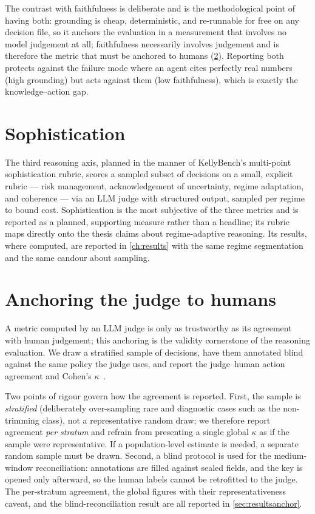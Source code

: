 The contrast with faithfulness is deliberate and is the methodological point of having both:
grounding is cheap, deterministic, and re-runnable for free on any decision file, so it
anchors the evaluation in a measurement that involves no model judgement at all; faithfulness
necessarily involves judgement and is therefore the metric that must be anchored to humans
(\cref{sec:anchor}). Reporting both protects against the failure mode where an agent cites
perfectly real numbers (high grounding) but acts against them (low faithfulness), which is
exactly the knowledge--action gap.

\section{Sophistication}
\label{sec:sophistication}

The third reasoning axis, planned in the manner of KellyBench's multi-point sophistication
rubric, scores a sampled subset of decisions on a small, explicit rubric --- risk
management, acknowledgement of uncertainty, regime adaptation, and coherence --- via an
LLM judge with structured output, sampled per regime to bound cost. Sophistication is the
most subjective of the three metrics and is reported as a planned, supporting measure rather
than a headline; its rubric maps directly onto the thesis claims about regime-adaptive
reasoning. Its results, where computed, are reported in \cref{ch:results} with the same
regime segmentation and the same candour about sampling.

\section{Anchoring the judge to humans}
\label{sec:anchor}

A metric computed by an LLM judge is only as trustworthy as its agreement with human
judgement; this anchoring is the validity cornerstone of the reasoning evaluation. We draw a
stratified sample of decisions, have them annotated blind against the same policy the judge
uses, and report the judge--human action agreement and Cohen's $\kappa$~\cite{cohen1960}.

Two points of rigour govern how the agreement is reported. First, the sample is
\emph{stratified} (deliberately over-sampling rare and diagnostic cases such as the
non-trimming class), not a representative random draw; we therefore report agreement
\emph{per stratum} and refrain from presenting a single global $\kappa$ as if the sample were
representative. If a population-level estimate is needed, a separate random sample must be
drawn. Second, a blind protocol is used for the medium-window reconciliation: annotations are
filled against sealed fields, and the key is opened only afterward, so the human labels
cannot be retrofitted to the judge. The per-stratum agreement, the global figures with their
representativeness caveat, and the blind-reconciliation result are all reported in
\cref{sec:resultsanchor}.

